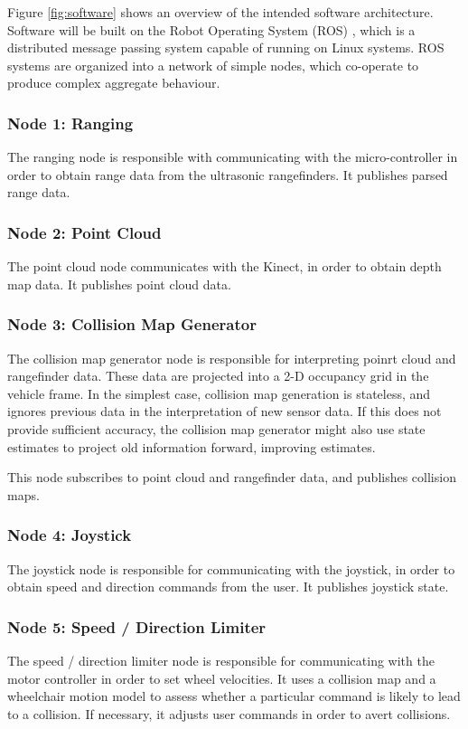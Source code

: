 \documentclass[oneside,final,a4paper]{report}
\begin{document}
Figure \ref{fig:software} shows an overview of the intended software architecture.  Software will be built on the Robot Operating System (ROS) \cite{ROS}, which is a distributed message passing system capable of running on Linux systems.  ROS systems are organized into a network of simple nodes, which co-operate to produce complex aggregate behaviour. 

\subsubsection{Node 1: Ranging}
The ranging node is responsible with communicating with the micro-controller in order to obtain range data from the ultrasonic rangefinders.  It publishes parsed range data.

\subsubsection{Node 2: Point Cloud}
The point cloud node communicates with the Kinect, in order to obtain depth map data.  It publishes point cloud data.

\subsubsection{Node 3: Collision Map Generator}
The collision map generator node is responsible for interpreting poinrt cloud and rangefinder data.  These data are projected into a 2-D occupancy grid in the vehicle frame.  In the simplest case, collision map generation is stateless, and ignores previous data in the interpretation of new sensor data.  If this does not provide sufficient accuracy, the collision map generator might also use state estimates to project old information forward, improving estimates.  

This node subscribes to point cloud and rangefinder data, and publishes collision maps.

\subsubsection{Node 4: Joystick}
The joystick node is responsible for communicating with the joystick, in order to obtain speed and direction commands from the user.  It publishes joystick state.

\subsubsection{Node 5: Speed / Direction Limiter}
The speed / direction limiter node is responsible for communicating with the motor controller in order to set wheel velocities.  It uses a collision map and a wheelchair motion model to assess whether a particular command is likely to lead to a collision.  If necessary, it adjusts user commands in order to avert collisions.
\end{document}
